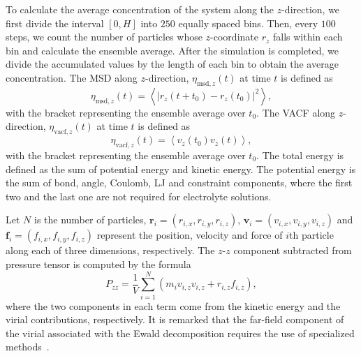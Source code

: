 To calculate the average concentration of the system along the $z$-direction, we first divide the interval $[0,H]$ into $250$ equally spaced bins. Then, every $100$ steps, we count the number of particles whose $z$-coordinate $r_z$ falls within each bin and calculate the ensemble average. After the simulation is completed, we divide the accumulated values by the length of each bin to obtain the average concentration. The MSD along $z$-direction, $\eta_{\text{msd},z}(t)$ at time $t$ is defined as
\begin{equation}
\eta_{\mathrm{msd},z}(t)=\left\langle\left|r_z\left(t+t_0\right)-r_z\left(t_0\right)\right|^2\right\rangle,
\end{equation}
with the bracket representing the ensemble average over $t_0$. The VACF along $z$-direction, $\eta_{\text{vacf},z}(t)$ at time $t$ is defined as
\begin{equation}
\eta_{\text {vacf},z}(t)=\left\langle v_z\left(t_0\right) v_z(t)\right\rangle,
\end{equation}
with the bracket representing the ensemble average over $t_0$. The total energy is defined as the sum of potential energy and kinetic energy. The potential energy is the sum of bond, angle, Coulomb, LJ and  {constraint} components, where the first two and the last one are not required for electrolyte solutions. 

Let $N$ is the number of particles, $\bm{r}_i=(r_{i,x},r_{i,y},r_{i,z})$, $\bm{v}_i=(v_{i,x},v_{i,y},v_{i,z})$ and $\bm{f}_i=(f_{i,x},f_{i,y},f_{i,z})$ represent the position, velocity and force of $i$th particle along each of three dimensions, respectively. The $z$-$z$ component subtracted from pressure tensor is computed by the formula
\begin{equation}
P_{zz}=\frac{1}{V} \sum_{i=1}^N\left(m_i v_{i,z} v_{i, z}+r_{i,z} f_{i,z}\right),
\end{equation}
where the two components in each term come from the kinetic energy and the virial contributions, respectively. It is remarked that the far-field component of  {the} virial associated with the Ewald decomposition requires the use of specialized methods~\cite{liang2022random}. 


